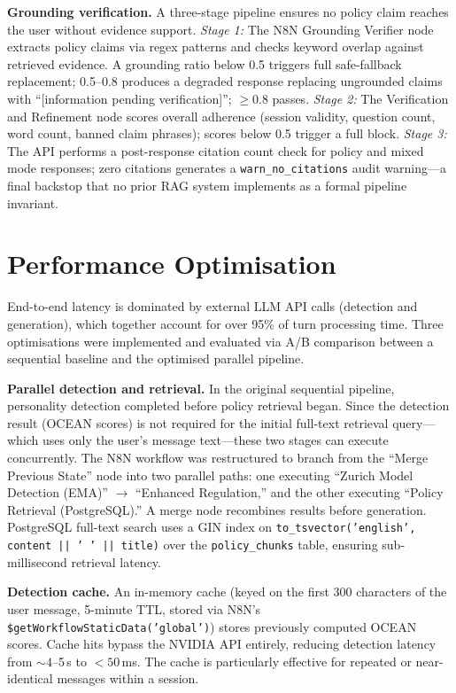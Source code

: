 \documentclass[10pt,a4paper]{report}
\begin{document}
\textbf{Grounding verification.} A three-stage pipeline ensures no policy claim reaches the user without evidence support. \emph{Stage 1:} The N8N Grounding Verifier node extracts policy claims via regex patterns and checks keyword overlap against retrieved evidence. A grounding ratio below 0.5 triggers full safe-fallback replacement; 0.5--0.8 produces a degraded response replacing ungrounded claims with ``[information pending verification]''; $\geq 0.8$ passes. \emph{Stage 2:} The Verification and Refinement node scores overall adherence (session validity, question count, word count, banned claim phrases); scores below 0.5 trigger a full block. \emph{Stage 3:} The API performs a post-response citation count check for policy and mixed mode responses; zero citations generates a \texttt{warn\_no\_citations} audit warning---a final backstop that no prior RAG system implements as a formal pipeline invariant.

\section{Performance Optimisation}
\label{sec:perf_opt}

End-to-end latency is dominated by external LLM API calls (detection and generation), which together account for over 95\% of turn processing time. Three optimisations were implemented and evaluated via A/B comparison between a sequential baseline and the optimised parallel pipeline.

\textbf{Parallel detection and retrieval.} In the original sequential pipeline, personality detection completed before policy retrieval began. Since the detection result (OCEAN scores) is not required for the initial full-text retrieval query---which uses only the user's message text---these two stages can execute concurrently. The N8N workflow was restructured to branch from the ``Merge Previous State'' node into two parallel paths: one executing ``Zurich Model Detection (EMA)'' $\rightarrow$ ``Enhanced Regulation,'' and the other executing ``Policy Retrieval (PostgreSQL).'' A merge node recombines results before generation. PostgreSQL full-text search uses a GIN index on \texttt{to\_tsvector('english', content || ' ' || title)} over the \texttt{policy\_chunks} table, ensuring sub-millisecond retrieval latency.

\textbf{Detection cache.} An in-memory cache (keyed on the first 300 characters of the user message, 5-minute TTL, stored via N8N's \texttt{\$getWorkflowStaticData('global')}) stores previously computed OCEAN scores. Cache hits bypass the NVIDIA API entirely, reducing detection latency from ${\sim}4$--5\,s to $<50$\,ms. The cache is particularly effective for repeated or near-identical messages within a session.
\end{document}
